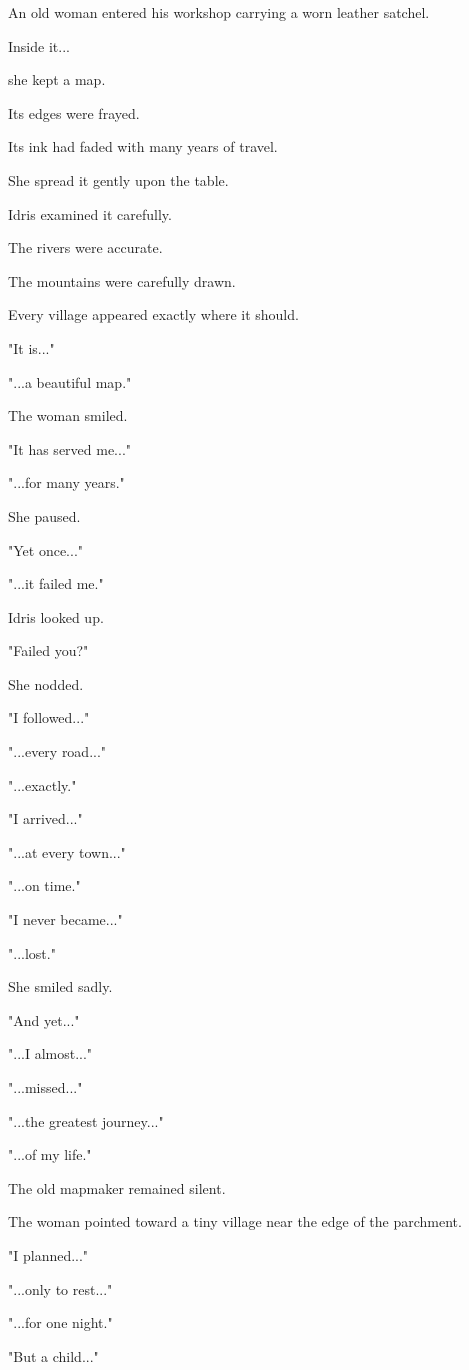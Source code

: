 \documentclass[12pt,openany]{book}
\begin{document}
An old woman entered his workshop carrying a worn leather satchel.

Inside it...

she kept a map.

Its edges were frayed.

Its ink had faded with many years of travel.

She spread it gently upon the table.

Idris examined it carefully.

The rivers were accurate.

The mountains were carefully drawn.

Every village appeared exactly where it should.

"It is..."

"...a beautiful map."

The woman smiled.

"It has served me..."

"...for many years."

She paused.

"Yet once..."

"...it failed me."

Idris looked up.

"Failed you?"

She nodded.

"I followed..."

"...every road..."

"...exactly."

"I arrived..."

"...at every town..."

"...on time."

"I never became..."

"...lost."

She smiled sadly.

"And yet..."

"...I almost..."

"...missed..."

"...the greatest journey..."

"...of my life."

The old mapmaker remained silent.

The woman pointed toward a tiny village near the edge of the parchment.

"I planned..."

"...only to rest..."

"...for one night."

"But a child..."
\end{document}
